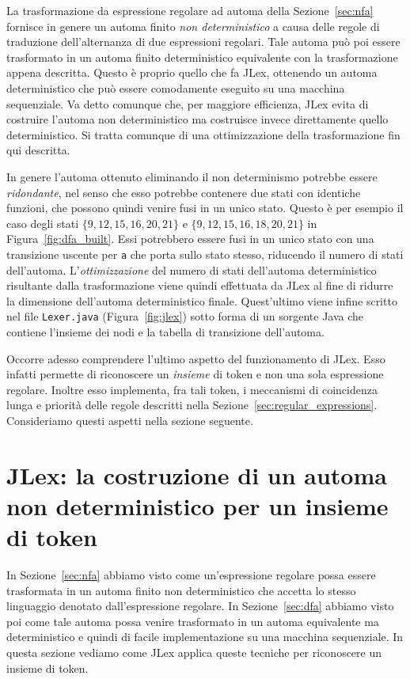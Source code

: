La trasformazione da espressione regolare ad automa della Sezione~\ref{sec:nfa}
fornisce in genere un automa finito \emph{non deterministico} a causa
delle regole di traduzione dell'alternanza di due espressioni regolari.
Tale automa pu\`o poi essere trasformato in un automa finito deterministico
equivalente con la trasformazione appena descritta. Questo \`e proprio
quello che fa JLex, ottenendo un automa deterministico che pu\`o
essere \piu comodamente eseguito su una macchina sequenziale.
Va detto comunque che, per maggiore efficienza, JLex
evita di costruire l'automa non deterministico ma costruisce invece
direttamente quello deterministico. Si tratta comunque di una ottimizzazione
della trasformazione fin qui descritta.

In genere l'automa ottenuto eliminando il
non determinismo potrebbe essere \emph{ridondante}, nel senso che
esso potrebbe contenere due stati con identiche funzioni, che possono quindi
venire fusi in un unico stato. Questo \`e per
esempio il caso degli stati $\{9,12,15,16,20,21\}$ e
$\{9,12,15,16,18,20,21\}$ in Figura~\ref{fig:dfa_built}. Essi potrebbero essere
fusi in un unico stato con una transizione uscente per \texttt{a} che porta
sullo stato stesso, riducendo il numero di stati dell'automa.
L'\emph{ottimizzazione} del numero di stati dell'automa deterministico
risultante dalla trasformazione viene quindi effettuata da JLex
al fine di ridurre la dimensione dell'automa deterministico finale.
Quest'ultimo viene infine scritto nel file \texttt{Lexer.java}
(Figura~\ref{fig:jlex}) sotto forma di un sorgente Java che contiene
l'insieme dei nodi e la tabella di transizione dell'automa.

Occorre adesso comprendere l'ultimo aspetto del funzionamento di JLex.
Esso infatti permette di riconoscere un \emph{insieme} di token e non una
sola espressione regolare. Inoltre esso implementa, fra tali token,
i meccanismi di coincidenza \piu lunga e priorit\`a delle regole
descritti nella Sezione~\ref{sec:regular_expressions}.
Consideriamo questi aspetti nella sezione seguente.
%
\section{JLex: la costruzione di un automa non deterministico per un insieme di token}\label{sec:jlex_for_tokens}
%
In Sezione~\ref{sec:nfa} abbiamo visto come un'espressione regolare possa
essere trasformata in un automa finito non deterministico che accetta lo
stesso linguaggio denotato dall'espressione regolare. In Sezione~\ref{sec:dfa}
abbiamo visto poi come tale automa possa venire trasformato in un automa
equivalente ma deterministico e quindi di \piu facile implementazione su una
macchina sequenziale. In questa sezione vediamo come JLex applica
queste tecniche per riconoscere un insieme di token.

